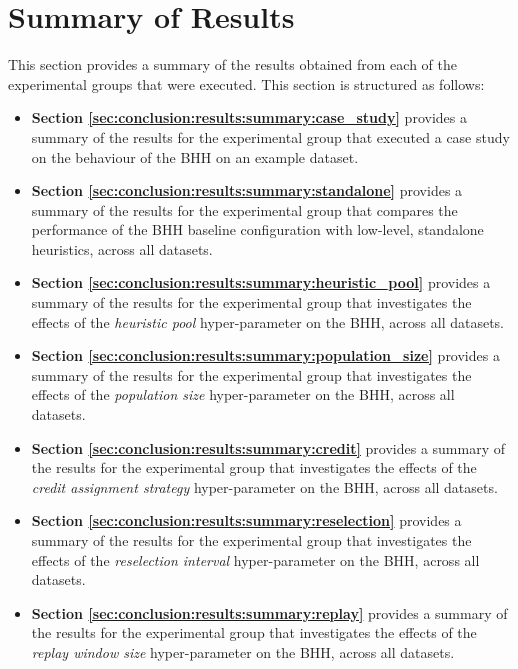 \section{Summary of Results}
\label{sec:conclusion:results}

This section provides a summary of the results obtained from each of the experimental groups that were executed. This section is structured as follows:

\begin{itemize}
      \item \textbf{Section \ref{sec:conclusion:results:summary:case_study}} provides a summary of the results for the experimental group that executed a case study on the behaviour of the \acs{BHH} on an example dataset.

      \item \textbf{Section \ref{sec:conclusion:results:summary:standalone}} provides a summary of the results for the experimental group that compares the performance of the \acs{BHH} baseline configuration with low-level, standalone heuristics, across all datasets.

      \item \textbf{Section \ref{sec:conclusion:results:summary:heuristic_pool}} provides a summary of the results for the experimental group that investigates the effects of the \textit{heuristic pool} hyper-parameter on the \acs{BHH}, across all datasets.

      \item \textbf{Section \ref{sec:conclusion:results:summary:population_size}} provides a summary of the results for the experimental group that investigates the effects of the \textit{population size} hyper-parameter on the \acs{BHH}, across all datasets.

      \item \textbf{Section \ref{sec:conclusion:results:summary:credit}} provides a summary of the results for the experimental group that investigates the effects of the \textit{credit assignment strategy} hyper-parameter on the \acs{BHH}, across all datasets.

      \item \textbf{Section \ref{sec:conclusion:results:summary:reselection}} provides a summary of the results for the experimental group that investigates the effects of the \textit{reselection interval} hyper-parameter on the \acs{BHH}, across all datasets.

      \item \textbf{Section \ref{sec:conclusion:results:summary:replay}} provides a summary of the results for the experimental group that investigates the effects of the \textit{replay window size} hyper-parameter on the \acs{BHH}, across all datasets.


\end{itemize}

